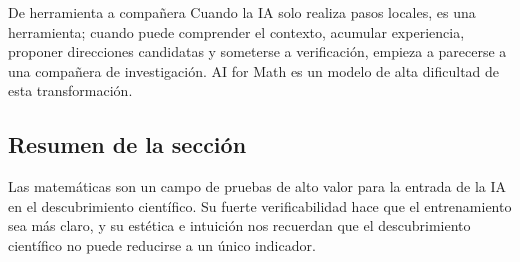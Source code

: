 \begin{importantbox}{De herramienta a compañera}
Cuando la IA solo realiza pasos locales, es una herramienta; cuando puede comprender el contexto, acumular experiencia, proponer direcciones candidatas y someterse a verificación, empieza a parecerse a una compañera de investigación. AI for Math es un modelo de alta dificultad de esta transformación.
\end{importantbox}

\subsection{Resumen de la sección}

Las matemáticas son un campo de pruebas de alto valor para la entrada de la IA en el descubrimiento científico. Su fuerte verificabilidad hace que el entrenamiento sea más claro, y su estética e intuición nos recuerdan que el descubrimiento científico no puede reducirse a un único indicador.
